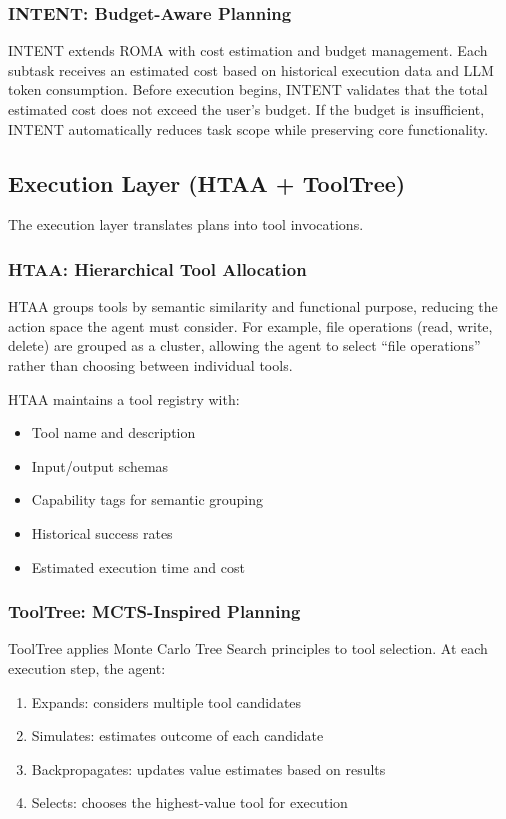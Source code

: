 \documentclass[12pt,a4paper]{article}
\begin{document}
\subsubsection{INTENT: Budget-Aware Planning}

INTENT extends ROMA with cost estimation and budget management. Each subtask receives an estimated cost based on historical execution data and LLM token consumption. Before execution begins, INTENT validates that the total estimated cost does not exceed the user's budget. If the budget is insufficient, INTENT automatically reduces task scope while preserving core functionality.

\subsection{Execution Layer (HTAA + ToolTree)}

The execution layer translates plans into tool invocations.

\subsubsection{HTAA: Hierarchical Tool Allocation}

HTAA groups tools by semantic similarity and functional purpose, reducing the action space the agent must consider. For example, file operations (read, write, delete) are grouped as a cluster, allowing the agent to select ``file operations'' rather than choosing between individual tools.

HTAA maintains a tool registry with:
\begin{itemize}
    \item Tool name and description
    \item Input/output schemas
    \item Capability tags for semantic grouping
    \item Historical success rates
    \item Estimated execution time and cost
\end{itemize}

\subsubsection{ToolTree: MCTS-Inspired Planning}

ToolTree applies Monte Carlo Tree Search principles to tool selection. At each execution step, the agent:

\begin{enumerate}
    \item Expands: considers multiple tool candidates
    \item Simulates: estimates outcome of each candidate
    \item Backpropagates: updates value estimates based on results
    \item Selects: chooses the highest-value tool for execution
\end{enumerate}
\end{document}
